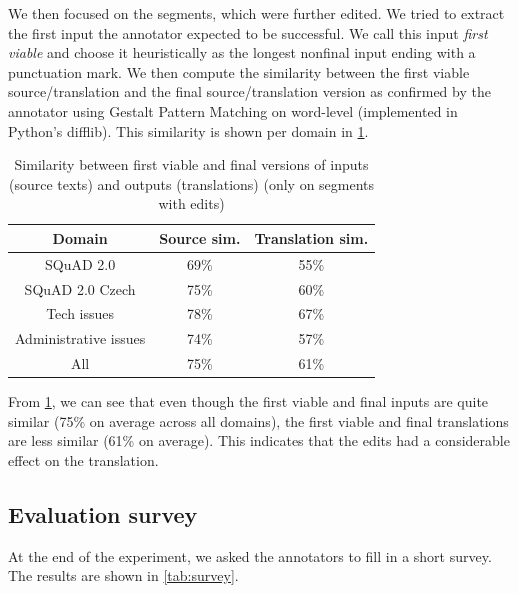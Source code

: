 We then focused on the segments, which were further edited. We tried to extract the first input the annotator expected to be successful. We call this input \textit{first viable} and choose it heuristically as the longest nonfinal input ending with a punctuation mark. We then compute the similarity between the first viable source/translation and the final source/translation version as confirmed by the annotator using Gestalt Pattern Matching on word-level (implemented in Python's difflib). This similarity is shown per domain in \cref{tab:similarity}.

\begin{table}[ht]
    \centering
    \begin{tabular}{| c c c |}
        \hline
        Domain & Source sim. & Translation sim. \\
    \hline
        SQuAD 2.0 & 69\% & 55\% \\
        SQuAD 2.0 Czech & 75\% & 60\% \\
        Tech issues & 78\% & 67\% \\
        Administrative issues & 74\% & 57\% \\
    \hline
        All & 75\% & 61\% \\
    \hline
    \end{tabular}
    \caption{\label{tab:similarity} Similarity between first viable and final versions of inputs (source texts) and outputs (translations) (only on segments with edits)}
\end{table}

From \cref{tab:similarity}, we can see that even though the first viable and final inputs are quite similar (75\% on average across all domains), the first viable and final translations are less similar (61\% on average). This indicates that the edits had a considerable effect on the translation.

\subsection{Evaluation survey}

At the end of the experiment, we asked the annotators to fill in a short survey. The results are shown in \cref{tab:survey}.

